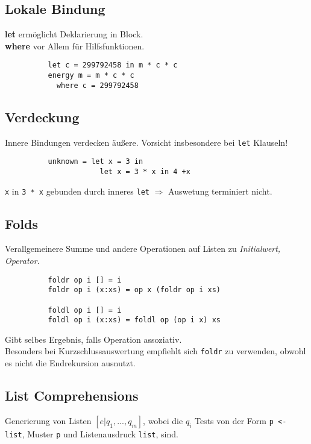 \documentclass[10pt,a4paper]{article}
\def\code#1{\texttt{#1}}
\begin{document}
        \subsection{Lokale Bindung}
        \textbf{let} ermöglicht Deklarierung in Block.\\
        \textbf{where} vor Allem für Hilfsfunktionen.\\
        \begin{lstlisting}
          let c = 299792458 in m * c * c
          energy m = m * c * c
            where c = 299792458
        \end{lstlisting}

        \subsection{Verdeckung}
        Innere Bindungen verdecken äußere.
        Vorsicht insbesondere bei \code{let} Klauseln!
        \begin{lstlisting}
          unknown = let x = 3 in
                      let x = 3 * x in 4 +x
        \end{lstlisting}
        \code{x} in \code{3 * x} gebunden durch inneres \code{let}
        \(\Rightarrow\) Auswetung terminiert nicht.

        \subsection{Folds}
        Verallgemeinere Summe und andere Operationen auf Listen zu \textit{Initialwert, Operator}.
        \begin{lstlisting}
          foldr op i [] = i
          foldr op i (x:xs) = op x (foldr op i xs)

          foldl op i [] = i
          foldl op i (x:xs) = foldl op (op i x) xs
        \end{lstlisting}
        Gibt selbes Ergebnis, falls Operation assoziativ.\\
        Besonders bei Kurzschlussauswertung empfiehlt sich \code{foldr} zu verwenden, obwohl es nicht die Endrekursion ausnutzt.

        \subsection{List Comprehensions}
        Generierung von Listen \code{\([e | q_1, ..., q_m]\)}, wobei die \code{\(q_i\)} Tests von der Form
        \code{p <- list}, Muster \code{p} und Listenausdruck \code{list}, sind.
\end{document}

